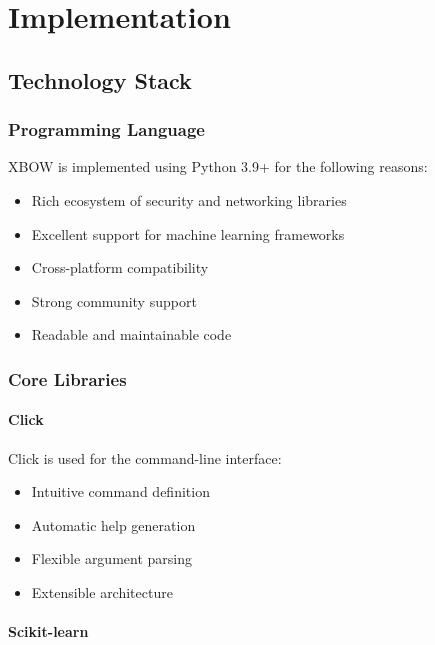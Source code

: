 \documentclass[12pt,a4paper]{report}
\begin{document}
\chapter{Implementation}

\section{Technology Stack}

\subsection{Programming Language}

XBOW is implemented using Python 3.9+ for the following reasons:

\begin{itemize}
    \item Rich ecosystem of security and networking libraries
    \item Excellent support for machine learning frameworks
    \item Cross-platform compatibility
    \item Strong community support
    \item Readable and maintainable code
\end{itemize}

\subsection{Core Libraries}

\subsubsection{Click}

Click is used for the command-line interface:

\begin{itemize}
    \item Intuitive command definition
    \item Automatic help generation
    \item Flexible argument parsing
    \item Extensible architecture
\end{itemize}

\subsubsection{Scikit-learn}
\end{document}
